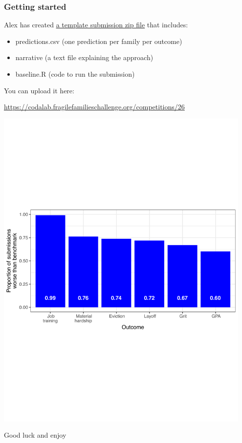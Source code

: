 \documentclass{beamer}
\begin{document}
\begin{frame}
\frametitle{Getting started}

Alex has created \href{https://github.com/compsocialscience/summer-institute/blob/master/2019/materials/day5-mass-collaboration/activity/submission.zip}{a template submission zip file} that includes:
\begin{itemize}
\item predictions.csv (one prediction per family per outcome)
\item narrative (a text file explaining the approach)
\item baseline.R (code to run the submission)
\end{itemize} 

\vfill
You can upload it here:
\large{
\begin{center}
\textcolor{blue}{\href{https://codalab.fragilefamilieschallenge.org/competitions/26}{https://codalab.fragilefamilieschallenge.org/competitions/26}}
\end{center}
}

\end{frame}
\begin{frame}

\begin{center}
\includegraphics[width=0.95\textwidth]{figures/worse_than_benchmark}
\end{center}

\end{frame}
\begin{frame}

\begin{center}
\LARGE Good luck and enjoy
\end{center}

\end{frame}
\end{document}
